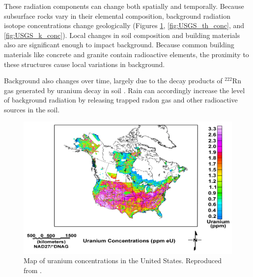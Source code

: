 These radiation components can change both spatially and temporally. Because subsurface rocks vary in their elemental composition, background radiation isotope concentrations change geologically (Figures \ref{fig:USGS_u_conc}, \ref{fig:USGS_th_conc}, and \ref{fig:USGS_k_conc}). Local changes in soil composition and building materials also are significant enough to impact background. Because common building materials like concrete and granite contain radioactive elements, the proximity to these structures cause local variations in background. 

Background also changes over time, largely due to the decay products of $^{222}$Rn gas generated by uranium decay in soil \cite{knoll}. Rain can accordingly increase the level of background radiation by releasing trapped radon gas and other radioactive sources in the soil.


\begin{figure}[H]
\centering
\includegraphics[trim=10 0 5 0, clip, width=1.0\linewidth]{images/USGS_u_conc}
\caption{Map of uranium concentrations in the United States. Reproduced from \cite{USGS}.}
\label{fig:USGS_u_conc}
\end{figure}

